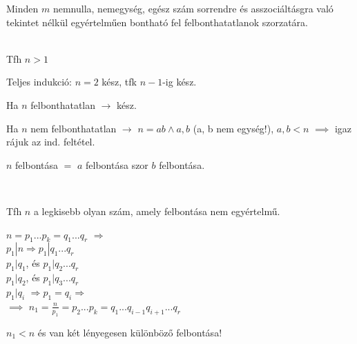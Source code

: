 \begin{frame}
  \begin{tcolorbox}[title={Tétel: A számelmélet alaptétele}]
    Minden $m$ nemnulla, nemegység, egész szám sorrendre és asszociáltásgra való tekintet nélkül egyértelműen bontható fel felbonthatatlanok szorzatára.
  \tcblower
    \mmedskip
    
    \\
    Tfh $n > 1$\\
    \msmallskip
    
    Teljes indukció: $n = 2$ kész, tfk $n - 1$-ig kész.\\
    \msmallskip

    Ha $n$ felbonthatatlan $\rightarrow$ kész.\\
    \msmallskip
    
    Ha $n$ nem felbonthatatlan $\rightarrow$ $n = ab \land a, b$ (a, b nem egység!), $a, b < n$ $\implies$ igaz rájuk az ind. feltétel.\\
    \msmallskip
    
    $n$ felbontása $=$ $a$ felbontása szor $b$ felbontása.\\
    \bigskip

    \\
    \msmallskip
    
    Tfh $n$ a legkisebb olyan szám, amely felbontása nem egyértelmű.\\
    \msmallskip
    
    $n = p_1 ... p_k = q_1 ... q_r$ $\Rightarrow$\\
    $p_1|n \Rightarrow p_1|q_1 ... q_r$\\
    $p_1|q_1$, és $p_1|q_2 ... q_r$\\
               \hspace{1em}$p_1|q_2$, és $ p_1|q_3 ... q_r$\\
                          \hspace{2em}$p_1|q_i$  $\Rightarrow p_1 = q_i \Rightarrow$\\
    $\implies$ $n_1 = \frac{n}{p_1} = p_2 ... p_k = q_1 ... q_{i-1}q_{i+1} ... q_r$\\
    \msmallskip
    
    $n_1 < n$ és van két lényegesen különböző felbontása!
  \end{tcolorbox}
\end{frame}

